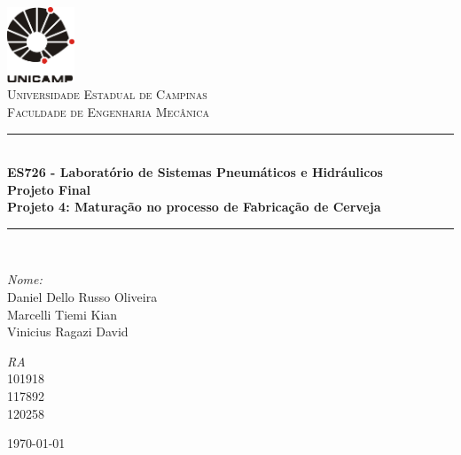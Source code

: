 
\begin{titlepage}
\begin{center}	

\newcommand{\HRule}{\rule{\linewidth}{0.5mm}}
\includegraphics[width=0.15\textwidth]{logoUnicamp}~\\[1cm]

\textsc{\LARGE Universidade Estadual de Campinas}\\[1.5cm]

\textsc{\Large Faculdade de Engenharia Mecânica}\\[0.5cm]

\HRule \\[0.4cm]
{ \Large \bfseries{ES726 - Laboratório de Sistemas Pneumáticos e Hidráulicos\\ \vspace{0.8cm} Projeto Final}\\
\large{Projeto 4: Maturação no processo de Fabricação de Cerveja}\\[0.4cm] }

\HRule \\[1.5cm]

\begin{minipage}{0.6\textwidth}
\begin{flushleft} \large
\emph{Nome:}\\
Daniel Dello Russo Oliveira\\ Marcelli Tiemi Kian\\ Vinicius Ragazi David
\end{flushleft}
\end{minipage}
\begin{minipage}{0.2\textwidth}
\begin{flushright} \large
\emph{RA}\\ 101918\\
117892\\ 120258
\end{flushright}
\end{minipage}

\vfill

{\large \today}

\end{center}
\end{titlepage}
